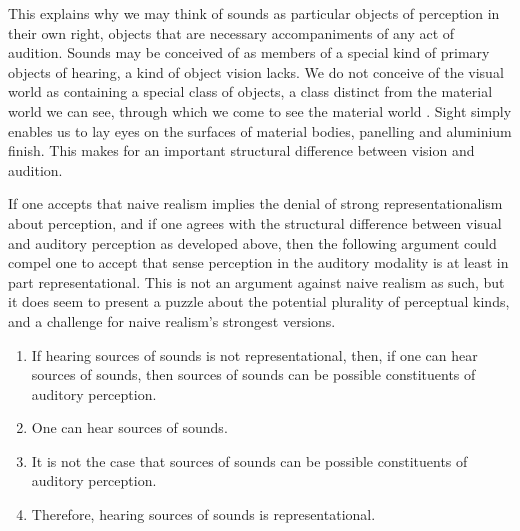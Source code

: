 \documentclass[sloppy, journal, git, bytitle, dodraft]{humapap}
\begin{document}
This explains why we may think of sounds as particular objects of perception in their own right, objects that are necessary accompaniments of any act of audition. Sounds may be conceived of as members of a special kind of primary objects of hearing, a kind of object vision lacks. We do not conceive of the visual world as containing a special class of objects, a class distinct from the material world we can see, through which we come to see the material world \autocite[cf.][p. 334]{martin2012aa}. Sight simply enables us to lay eyes on the surfaces of material bodies, panelling and aluminium finish. This makes for an important structural difference between vision and audition. 


\sect If one accepts that naive realism implies the denial of strong representationalism about perception, and if one agrees with the structural difference between visual and auditory perception as developed above, then the following argument could compel one to accept that sense perception in the auditory modality is at least in part representational. This is not an argument against naive realism as such, but it does seem to present a puzzle about the potential plurality of perceptual kinds, and a challenge for naive realism's strongest versions. 
\begin{enumerate}
\subsubsection*{Argument for `source representationalism'}
\item If hearing sources of sounds is not representational, then, if one can hear sources of sounds, then sources of sounds can be possible constituents of auditory perception.
\item One can hear sources of sounds.
\item It is not the case that sources of sounds can be possible constituents of auditory perception.
\item Therefore, hearing sources of sounds is  representational.
\end{enumerate}
\end{document}
